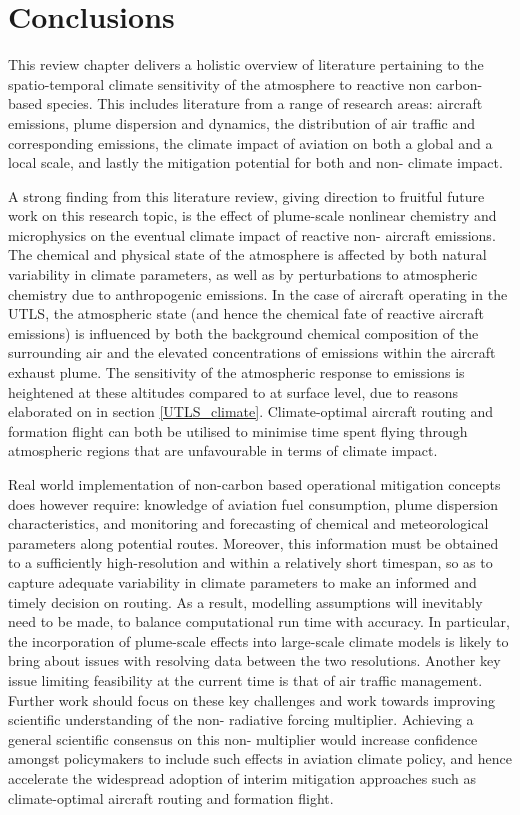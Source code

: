 \section{Conclusions}
This review chapter delivers a holistic overview of literature pertaining to the spatio-temporal climate sensitivity of the atmosphere to reactive non carbon-based species. This includes literature from a range of research areas: aircraft emissions, plume dispersion and dynamics, the distribution of air traffic and corresponding emissions, the climate impact of aviation on both a global and a local scale, and lastly the mitigation potential for both  and non- climate impact. 

A strong finding from this literature review, giving direction to fruitful future work on this research topic, is the effect of plume-scale nonlinear chemistry and microphysics on the eventual climate impact of reactive non- aircraft emissions. The chemical and physical state of the atmosphere is affected by both natural variability in climate parameters, as well as by perturbations to atmospheric chemistry due to anthropogenic emissions. In the case of aircraft operating in the UTLS, the atmospheric state (and hence the chemical fate of reactive aircraft emissions) is influenced by both the background chemical composition of the surrounding air and the elevated concentrations of emissions within the aircraft exhaust plume. The sensitivity of the atmospheric response to emissions is heightened at these altitudes compared to at surface level, due to reasons elaborated on in section \ref{UTLS_climate}. Climate-optimal aircraft routing and formation flight can both be utilised to minimise time spent flying through atmospheric regions that are unfavourable in terms of climate impact.

Real world implementation of non-carbon based operational mitigation concepts does however require: knowledge of aviation fuel consumption, plume dispersion characteristics, and monitoring and forecasting of chemical and meteorological parameters along potential routes. Moreover, this information must be obtained to a sufficiently high-resolution and within a relatively short timespan, so as to capture adequate variability in climate parameters to make an informed and timely decision on routing. As a result, modelling assumptions will inevitably need to be made, to balance computational run time with accuracy. In particular, the incorporation of plume-scale effects into large-scale climate models is likely to bring about issues with resolving data between the two resolutions. Another key issue limiting feasibility at the current time is that of air traffic management. Further work should focus on these key challenges and work towards improving scientific understanding of the non- radiative forcing multiplier. Achieving a general scientific consensus on this non- multiplier would increase confidence amongst policymakers to include such effects in aviation climate policy, and hence accelerate the widespread adoption of interim mitigation approaches such as climate-optimal aircraft routing and formation flight.

